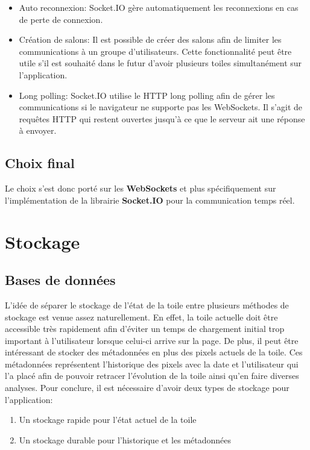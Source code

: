 \begin{itemize}
  \item Auto reconnexion: Socket.IO gère automatiquement les reconnexions en cas de perte de connexion.
  \item Création de salons: Il est possible de créer des salons afin de limiter les communications à un groupe d'utilisateurs. Cette fonctionnalité peut être utile s'il est souhaité dans le futur d'avoir plusieurs toiles simultanément sur l'application.
  \item Long polling: Socket.IO utilise le HTTP long polling afin de gérer les communications si le navigateur ne supporte pas les WebSockets. Il s'agit de requêtes HTTP qui restent ouvertes jusqu'à ce que le serveur ait une réponse à envoyer.
\end{itemize}

\subsection{Choix final}

Le choix s'est donc porté sur les \textbf{WebSockets} et plus spécifiquement sur l'implémentation de la librairie \textbf{Socket.IO} pour la communication temps réel.

\section{Stockage}

\subsection{Bases de données}

L'idée de séparer le stockage de l'état de la toile entre plusieurs méthodes de stockage est venue assez naturellement. En effet, la toile actuelle doit être accessible très rapidement afin d'éviter un temps de chargement initial trop important à l'utilisateur lorsque celui-ci arrive sur la page. De plus, il peut être intéressant de stocker des métadonnées en plus des pixels actuels de la toile. Ces métadonnées représentent l'historique des pixels avec la date et l'utilisateur qui l'a placé afin de pouvoir retracer l'évolution de la toile ainsi qu'en faire diverses analyses. Pour conclure, il est nécessaire d'avoir deux types de stockage pour l'application:

\begin{enumerate}
  \item Un stockage rapide pour l'état actuel de la toile
  \item Un stockage durable pour l'historique et les métadonnées
\end{enumerate}

